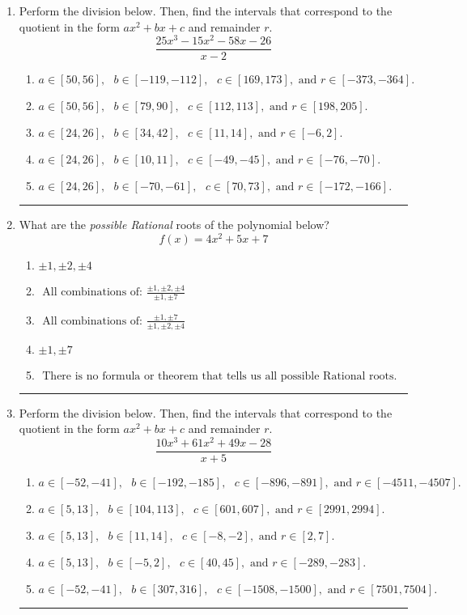 \documentclass[14pt]{extbook}
\newcommand{\litem}[1]{\item#1\hspace*{-1cm}\rule{\textwidth}{0.4pt}}
\begin{document}
\begin{enumerate}
{\begin{enumerate}[label=\Alph*.]
\end{enumerate} }
\litem{
Perform the division below. Then, find the intervals that correspond to the quotient in the form $ax^2+bx+c$ and remainder $r$.\[ \frac{25x^{3} -15 x^{2} -58 x -26}{x -2} \]\begin{enumerate}[label=\Alph*.]
\item \( a \in [50, 56], \text{   } b \in [-119, -112], \text{   } c \in [169, 173], \text{   and   } r \in [-373, -364]. \)
\item \( a \in [50, 56], \text{   } b \in [79, 90], \text{   } c \in [112, 113], \text{   and   } r \in [198, 205]. \)
\item \( a \in [24, 26], \text{   } b \in [34, 42], \text{   } c \in [11, 14], \text{   and   } r \in [-6, 2]. \)
\item \( a \in [24, 26], \text{   } b \in [10, 11], \text{   } c \in [-49, -45], \text{   and   } r \in [-76, -70]. \)
\item \( a \in [24, 26], \text{   } b \in [-70, -61], \text{   } c \in [70, 73], \text{   and   } r \in [-172, -166]. \)

\end{enumerate} }
\litem{
What are the \textit{possible Rational} roots of the polynomial below?\[ f(x) = 4x^{2} +5 x + 7 \]\begin{enumerate}[label=\Alph*.]
\item \( \pm 1,\pm 2,\pm 4 \)
\item \( \text{ All combinations of: }\frac{\pm 1,\pm 2,\pm 4}{\pm 1,\pm 7} \)
\item \( \text{ All combinations of: }\frac{\pm 1,\pm 7}{\pm 1,\pm 2,\pm 4} \)
\item \( \pm 1,\pm 7 \)
\item \( \text{ There is no formula or theorem that tells us all possible Rational roots.} \)

\end{enumerate} }
\litem{
Perform the division below. Then, find the intervals that correspond to the quotient in the form $ax^2+bx+c$ and remainder $r$.\[ \frac{10x^{3} +61 x^{2} +49 x -28}{x + 5} \]\begin{enumerate}[label=\Alph*.]
\item \( a \in [-52, -41], \text{   } b \in [-192, -185], \text{   } c \in [-896, -891], \text{   and   } r \in [-4511, -4507]. \)
\item \( a \in [5, 13], \text{   } b \in [104, 113], \text{   } c \in [601, 607], \text{   and   } r \in [2991, 2994]. \)
\item \( a \in [5, 13], \text{   } b \in [11, 14], \text{   } c \in [-8, -2], \text{   and   } r \in [2, 7]. \)
\item \( a \in [5, 13], \text{   } b \in [-5, 2], \text{   } c \in [40, 45], \text{   and   } r \in [-289, -283]. \)
\item \( a \in [-52, -41], \text{   } b \in [307, 316], \text{   } c \in [-1508, -1500], \text{   and   } r \in [7501, 7504]. \)


\end{enumerate}}
\end{enumerate}
\end{document}
